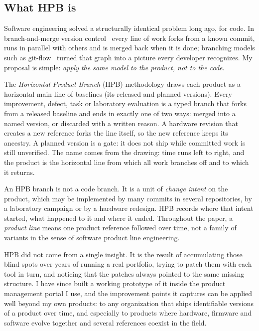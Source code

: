 \subsection{What HPB is}
\label{sec:intro-what}

Software engineering solved a structurally identical problem long ago, for
code. In branch-and-merge version control~\citep{chacon2014progit} every
line of work forks from a known commit, runs in parallel with others and
is merged back when it is done; branching models such as
git-flow~\citep{driessen2010gitflow} turned that graph into a picture every
developer recognizes. My proposal is simple: \emph{apply the same model to
the product, not to the code}.

The \emph{Horizontal Product Branch} (HPB) methodology draws each product
as a horizontal main line of baselines (its released and planned
versions). Every improvement, defect, task or laboratory evaluation is a
typed branch that forks from a released baseline and ends in exactly one
of two ways: merged into a named version, or discarded with a written
reason. A hardware revision that creates a new reference forks the line
itself, so the new reference keeps its ancestry. A planned version is a
gate: it does not ship while committed work is still unverified. The name
comes from the drawing: time runs left to right, and the product is the
horizontal line from which all work branches off and to which it returns.

An HPB branch is not a code branch. It is a unit of \emph{change intent}
on the product, which may be implemented by many commits in several
repositories, by a laboratory campaign or by a hardware redesign. HPB
records where that intent started, what happened to it and where it ended.
Throughout the paper, a \emph{product line} means one product reference
followed over time, not a family of variants in the sense of software
product line engineering.

HPB did not come from a single insight. It is the result of accumulating
those blind spots over years of running a real portfolio, trying to patch
them with each tool in turn, and noticing that the patches always pointed
to the same missing structure. I have since built a working prototype of
it inside the product management portal I use, and the improvement points
it captures can be applied well beyond my own products: to any
organization that ships identifiable versions of a product over time,
and especially to products where hardware, firmware and software evolve
together and several references coexist in the field.

